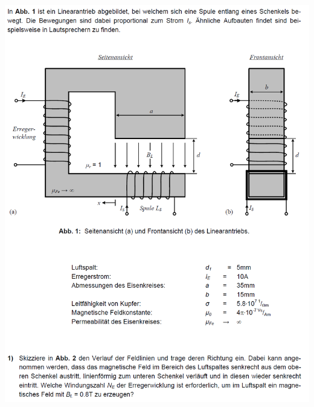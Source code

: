 \documentclass[a4paper, 8pt, landscape]{scrartcl} %
\begin{document}
\begin{multicols}{2}
\includegraphics[width=\columnwidth]{img/induktion_2.PNG} \\
\vfill \null \columnbreak



\end{multicols}
\end{document}
